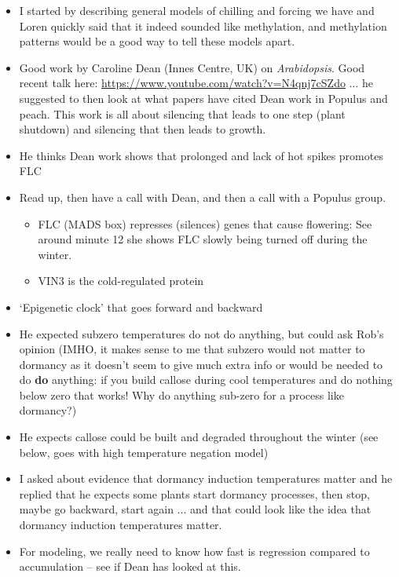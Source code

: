 \documentclass[11pt,letter]{article}
\begin{document}
\begin{itemize}
\item I started by describing general models of chilling and forcing we have and Loren quickly said that it indeed sounded like methylation, and  methylation patterns would be a good way to tell these models apart. 
\item Good work by Caroline Dean (Innes Centre, UK) on \emph{Arabidopsis}. Good recent talk here: \url{https://www.youtube.com/watch?v=N4qnj7cSZdo} ... he suggested to then look at what papers have cited Dean work in Populus and peach. This work is all about silencing that leads to one step (plant shutdown) and silencing that then leads to growth. 
\item He thinks Dean work shows that prolonged and lack of hot spikes promotes FLC
\item Read up, then have a call with Dean, and then a call with a Populus group. 
\begin{itemize}
\item FLC (MADS box) represses (silences) genes that cause flowering: See around minute 12 she shows FLC slowly being turned off during the winter. 
\item VIN3 is the cold-regulated protein
\end{itemize}
\item `Epigenetic clock' that goes forward and backward
\item He expected subzero temperatures do not do anything, but could ask Rob's opinion (IMHO, it makes sense to me that subzero would not matter to dormancy as it doesn't seem to give much extra info or would be needed to do {\bf do} anything: if you build callose during cool temperatures and do nothing below zero that works! Why do anything sub-zero for a process like dormancy?)
\item He expects callose could be built and degraded throughout the winter (see below, goes with high temperature negation model)
\item I asked about evidence that dormancy induction temperatures matter and he replied that he expects some plants start dormancy processes, then stop, maybe go backward, start again ... and that could look like the idea that dormancy induction temperatures matter. 
\item For modeling, we really need to know how fast is regression compared to accumulation -- see if Dean has looked at this. 
\end{itemize}
\end{document}
